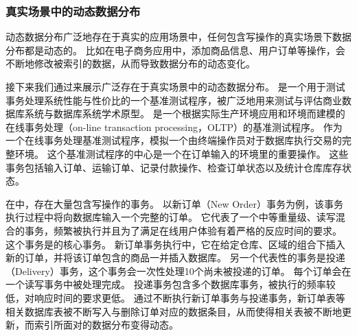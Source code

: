 \subsubsection{真实场景中的动态数据分布}

动态数据分布广泛地存在于真实的应用场景中，任何包含写操作的真实场景下数据分布都是动态的。
比如在电子商务应用中，添加商品信息、用户订单等操作，会不断地修改被索引的数据，从而导致数据分布的动态变化。

接下来我们通过{\tpcc}来展示广泛存在于真实场景中的动态数据分布。
{\tpcc}是一个用于测试事务处理系统性能与性价比的一个基准测试程序，被广泛地用来测试与评估商业数据库系统与数据库系统学术原型。
{\tpcc}是一个根据实际生产环境应用和环境而建模的在线事务处理（on-line transaction processing，OLTP）的基准测试程序。
作为一个在线事务处理基准测试程序，{\tpcc}模拟一个由终端操作员对于数据库执行交易的完整环境。
这个基准测试程序的中心是一个在订单输入的环境里的重要操作。
这些事务包括输入订单、运输订单、记录付款操作、检查订单状态以及统计仓库库存状态。


在{\tpcc}中，存在大量包含写操作的事务。
以新订单（New Order）事务为例，该事务执行过程中将向数据库输入一个完整的订单。
它代表了一个中等重量级、读写混合的事务，频繁被执行并且为了满足在线用户体验有着严格的反应时间的要求。
这个事务是{\tpcc}的核心事务。
新订单事务执行中，它在给定仓库、区域的组合下插入新的订单，并将该订单包含的商品一并插入数据库。
另一个代表性的事务是投递（Delivery）事务，这个事务会一次性处理10个尚未被投递的订单。
每个订单会在一个读写事务中被处理完成。
投递事务包含多个数据库事务，被执行的频率较低，对响应时间的要求更低。
通过不断执行新订单事务与投递事务，新订单表等相关数据库表被不断写入与删除订单对应的数据条目，从而使得相关表被不断地更新，而索引所面对的数据分布变得动态。

